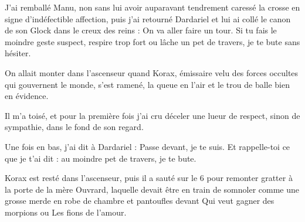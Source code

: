 J’ai remballé Manu, non sans lui avoir auparavant tendrement caressé la crosse en signe d’indéfectible affection, puis j’ai retourné Dardariel et lui ai collé le canon de son Glock dans le creux des reins : On va aller faire un tour. Si tu fais le moindre geste suspect, respire trop fort ou lâche un pet de travers, je te bute sans hésiter.

On allait monter dans l’ascenseur quand Korax, émissaire velu des forces occultes qui gouvernent le monde, s’est ramené, la queue en l’air et le trou de balle bien en évidence.

Il m’a toisé, et pour la première fois j’ai cru déceler une lueur de respect, sinon de sympathie, dans le fond de son regard.

Une fois en bas, j’ai dit à Dardariel : Passe devant, je te suis. Et rappelle-toi ce que je t’ai dit : au moindre pet de travers, je te bute.

Korax est resté dans l’ascenseur, puis il a sauté sur le 6 pour remonter gratter à la porte de la mère Ouvrard, laquelle devait être en train de somnoler comme une grosse merde en robe de chambre et pantoufles devant Qui veut gagner des morpions ou Les fions de l’amour.

